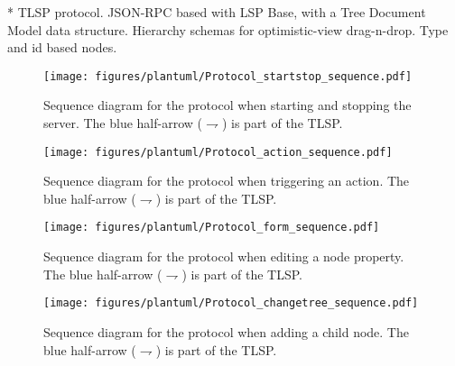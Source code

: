 * TLSP protocol. JSON-RPC based with LSP Base, with a Tree Document Model data structure. Hierarchy schemas for optimistic-view drag-n-drop. Type and id based nodes. 

\newcommand{\bluearrowDesc}{The blue half-arrow ($\rightharpoondown$) is part of the \acrfull{TLSP}.}

\begin{figure}[htbp]  %
  \centering
  \texttt{[image: figures/plantuml/Protocol\_startstop\_sequence.pdf]}
  \caption[Protocol Sequence Diagram of Start/Stop]{Sequence diagram for the protocol when starting and stopping the server. \bluearrowDesc}\label{fig:protocol-startstop}
\end{figure}

\begin{figure}[htbp]  %
  \centering
  \texttt{[image: figures/plantuml/Protocol\_action\_sequence.pdf]}
  \caption[Protocol Sequence Diagram of Action Triggering]{Sequence diagram for the protocol when triggering an action. \bluearrowDesc}\label{fig:protocol-action}
\end{figure}

\begin{figure}[htbp]  %
  \centering
  \texttt{[image: figures/plantuml/Protocol\_form\_sequence.pdf]}
  \caption[Protocol Sequence Diagram of Property Form]{Sequence diagram for the protocol when editing a node property. \bluearrowDesc}\label{fig:protocol-form}
\end{figure}

\begin{figure}[htbp]  %
  \centering
  \texttt{[image: figures/plantuml/Protocol\_changetree\_sequence.pdf]}
  \caption[Protocol Sequence Diagram of Tree Changes]{Sequence diagram for the protocol when adding a child node. \bluearrowDesc}\label{fig:protocol-changetree}
\end{figure}

\FloatBarrier
